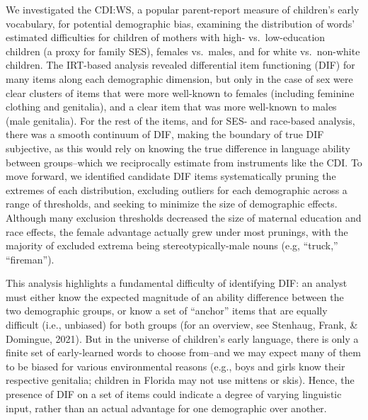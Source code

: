 \documentclass[10pt, letterpaper]{article}
\begin{document}
We investigated the CDI:WS, a popular parent-report measure of
children's early vocabulary, for potential demographic bias, examining
the distribution of words' estimated difficulties for children of
mothers with high- vs.~low-education children (a proxy for family SES),
females vs.~males, and for white vs.~non-white children. The IRT-based
analysis revealed differential item functioning (DIF) for many items
along each demographic dimension, but only in the case of sex were clear
clusters of items that were more well-known to females (including
feminine clothing and genitalia), and a clear item that was more
well-known to males (male genitalia). For the rest of the items, and for
SES- and race-based analysis, there was a smooth continuum of DIF,
making the boundary of true DIF subjective, as this would rely on
knowing the true difference in language ability between groups--which we
reciprocally estimate from instruments like the CDI. To move forward, we
identified candidate DIF items systematically pruning the extremes of
each distribution, excluding outliers for each demographic across a
range of thresholds, and seeking to minimize the size of demographic
effects. Although many exclusion thresholds decreased the size of
maternal education and race effects, the female advantage actually grew
under most prunings, with the majority of excluded extrema being
stereotypically-male nouns (e.g, ``truck,'' ``fireman'').

This analysis highlights a fundamental difficulty of identifying DIF: an
analyst must either know the expected magnitude of an ability difference
between the two demographic groups, or know a set of ``anchor'' items
that are equally difficult (i.e., unbiased) for both groups (for an
overview, see Stenhaug, Frank, \& Domingue, 2021). But in the universe
of children's early language, there is only a finite set of
early-learned words to choose from--and we may expect many of them to be
biased for various environmental reasons (e.g., boys and girls know
their respective genitalia; children in Florida may not use mittens or
skis). Hence, the presence of DIF on a set of items could indicate a
degree of varying linguistic input, rather than an actual advantage for
one demographic over another.
\end{document}
